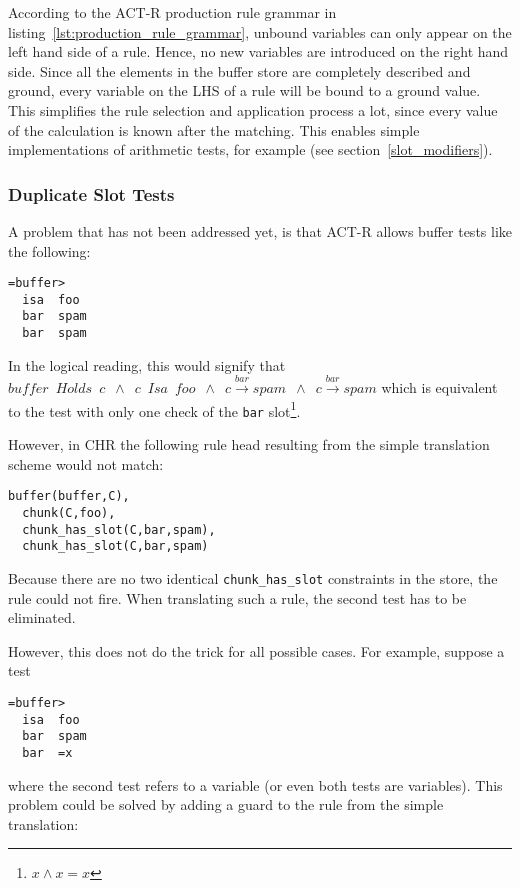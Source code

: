According to the ACT-R production rule grammar in listing~\ref{lst:production_rule_grammar}, unbound variables can only appear on the left hand side of a rule. Hence, no new variables are introduced on the right hand side. Since all the elements in the buffer store are completely described and ground, every variable on the LHS of a rule will be bound to a ground value. This simplifies the rule selection and application process a lot, since every value of the calculation is known after the matching. This enables simple implementations of arithmetic tests, for example (see section~\ref{slot_modifiers}).

\subsubsection{Duplicate Slot Tests}
\label{implementation:duplicate_slot_tests}

A problem that has not been addressed yet, is that ACT-R allows buffer tests like the following:

\begin{lstlisting}
=buffer>
  isa  foo
  bar  spam
  bar  spam
\end{lstlisting}

In the logical reading, this would signify that $buffer \enspace Holds \enspace c \enspace \wedge \enspace c \enspace Isa \enspace foo \enspace \wedge \enspace c \xrightarrow{bar} spam \enspace \wedge \enspace c \xrightarrow{bar} spam$ which is equivalent to the test with only one check of the \lstinline|bar| slot\footnote{$x \wedge x = x$}.

However, in CHR the following rule head resulting from the simple translation scheme would not match:

\begin{lstlisting}
buffer(buffer,C),
  chunk(C,foo),
  chunk_has_slot(C,bar,spam),
  chunk_has_slot(C,bar,spam)
\end{lstlisting}

Because there are no two identical \lstinline|chunk_has_slot| constraints in the store, the rule could not fire. When translating such a rule, the second test has to be eliminated.

However, this does not do the trick for all possible cases. For example, suppose a test

\begin{lstlisting}
=buffer>
  isa  foo
  bar  spam
  bar  =x
\end{lstlisting}

where the second test refers to a variable (or even both tests are variables). This problem could be solved by adding a guard to the rule from the simple translation:

